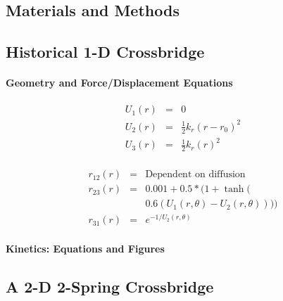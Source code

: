 \documentclass[11pt]{article}
\begin{document}
\begin{multicols}{2}
\section*{Materials and Methods}

\subsection*{Historical 1-D Crossbridge}


\paragraph*{Geometry and Force/Displacement Equations}

\begin{eqnarray}
\label{1sEnergy}
    U_1(r) & = & 0 \nonumber \\
    U_2(r) & = & \frac{1}{2}k_r (r-r_0)^2 \nonumber \\
    U_3(r) & = & \frac{1}{2}k_r (r)^2 \\
\end{eqnarray}

\begin{eqnarray}  
\label{1sTransRates}
	r_{12}(r)   & = & \text{Dependent on diffusion} \nonumber \\
    r_{23}(r)   & = & 0.001 + 0.5 * (1 + \tanh( \nonumber \\
                        &   & 0.6 (U_1(r, \theta) - U_2(r, \theta)))) \\
	r_{31}(r)   & = & e^{-1 / U_2(r, \theta)}
\end{eqnarray} 
 
\paragraph*{Kinetics: Equations and Figures}


\subsection*{A 2-D 2-Spring Crossbridge}


\end{multicols}
\end{document}
